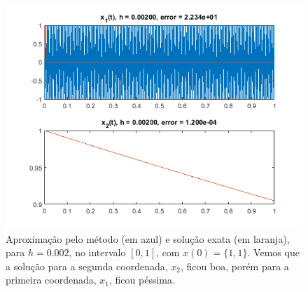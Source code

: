\documentclass{article}
\begin{document}
\begin{enumerate}
\begin{enumerate}
                \begin{figure}[!h]
                    \centering
                    \includegraphics[width=\textwidth]{forward_2.png}
                    \caption{Aproximação pelo método (em azul) e
                    solução exata (em laranja), para $h = 0.002$,
                    no intervalo $[0, 1]$, com $x(0) = \{1, 1\}$.
                    Vemos que a solução para a segunda
                    coordenada, $x_2$, ficou boa, porém para a primeira
                    coordenada, $x_1$, ficou péssima.}
                    \label{fig:forward_2}
                \end{figure}
                

\end{enumerate}
\end{enumerate}
\end{document}
